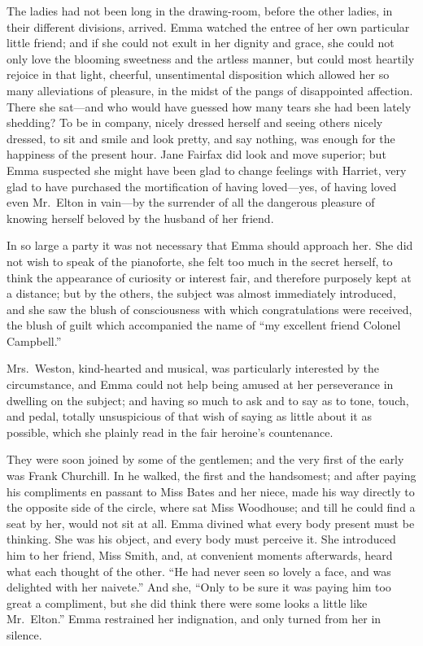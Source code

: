 The ladies had not been long in the drawing-room, before the other ladies,
in their different divisions, arrived.  Emma watched the entree of her
own particular little friend; and if she could not exult in her dignity
and grace, she could not only love the blooming sweetness and the
artless manner, but could most heartily rejoice in that light, cheerful,
unsentimental disposition which allowed her so many alleviations
of pleasure, in the midst of the pangs of disappointed affection.
There she sat---and who would have guessed how many tears she had
been lately shedding?  To be in company, nicely dressed herself
and seeing others nicely dressed, to sit and smile and look pretty,
and say nothing, was enough for the happiness of the present hour.
Jane Fairfax did look and move superior; but Emma suspected she
might have been glad to change feelings with Harriet, very glad
to have purchased the mortification of having loved---yes, of having
loved even Mr.\ Elton in vain---by the surrender of all the dangerous
pleasure of knowing herself beloved by the husband of her friend.

In so large a party it was not necessary that Emma should approach her.
She did not wish to speak of the pianoforte, she felt too much
in the secret herself, to think the appearance of curiosity
or interest fair, and therefore purposely kept at a distance;
but by the others, the subject was almost immediately introduced,
and she saw the blush of consciousness with which congratulations
were received, the blush of guilt which accompanied the name of ``my
excellent friend Colonel Campbell.''

Mrs.\ Weston, kind-hearted and musical, was particularly interested
by the circumstance, and Emma could not help being amused at her
perseverance in dwelling on the subject; and having so much to ask
and to say as to tone, touch, and pedal, totally unsuspicious
of that wish of saying as little about it as possible, which she
plainly read in the fair heroine's countenance.

They were soon joined by some of the gentlemen; and the very first of the
early was Frank Churchill.  In he walked, the first and the handsomest;
and after paying his compliments en passant to Miss Bates and
her niece, made his way directly to the opposite side of the circle,
where sat Miss Woodhouse; and till he could find a seat by her,
would not sit at all.  Emma divined what every body present must
be thinking.  She was his object, and every body must perceive it.
She introduced him to her friend, Miss Smith, and, at convenient
moments afterwards, heard what each thought of the other.  ``He had
never seen so lovely a face, and was delighted with her naivete.''
And she, ``Only to be sure it was paying him too great a compliment,
but she did think there were some looks a little like Mr.\ Elton.''
Emma restrained her indignation, and only turned from her in silence.

